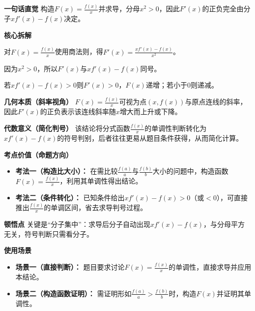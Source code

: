 \begin{explanationbox}
	\textbf{\textcolor{CExplanation}{一句话直觉}}
	构造$F(x)=\frac{f(x)}{x}$并求导，分母$x^{2}>0$，因此$F'(x)$的正负完全由分子$x f'(x)-f(x)$决定。

	\medskip
	\textbf{\textcolor{CExplanation}{核心拆解}}
	\begin{description}[style=nextline, leftmargin=2.8em, labelsep=0.5em, itemsep=0.45em]
		\item[\textbf{要点一（求导结果）：}]
			对$F(x)=\frac{f(x)}{x}$使用商法则，得$F'(x)=\frac{x f'(x)-f(x)}{x^{2}}$。
		\item[\textbf{要点二（符号判定）：}]
			因为$x^{2}>0$，所以$F'(x)$与$x f'(x)-f(x)$同号。
		\item[\textbf{要点三（单调对应）：}]
			若$x f'(x)-f(x)>0$则$F'(x)>0$，$F(x)$递增；若小于$0$则递减。
	\end{description}

	\medskip
	\textbf{\textcolor{CExplanation}{几何本质（斜率视角）}}
	$F(x)=\frac{f(x)}{x}$可视为点$(x,f(x))$与原点连线的斜率，因此$F'(x)$的正负表示该连线斜率随$x$增大而上升或下降。

	\medskip
	\textbf{\textcolor{CExplanation}{代数意义（简化判号）}}
	该结论将分式函数$\frac{f(x)}{x}$的单调性判断转化为$x f'(x)-f(x)$的符号判别，后者往往更易从题目条件获得，从而简化计算。

	\medskip
	\textbf{\textcolor{CExplanation}{考点价值（命题方向）}}
	\begin{itemize}[leftmargin=*, itemsep=0.5em, topsep=0.4em]
		\item \textbf{考法一（构造比大小）：} 在需比较$\frac{f(a)}{a}$与$\frac{f(b)}{b}$大小的问题中，构造函数$F(x)=\frac{f(x)}{x}$，利用其单调性得出结论。
		\item \textbf{考法二（条件转化）：} 已知条件给出$x f'(x)-f(x)>0$（或$<0$），可直接推出$\frac{f(x)}{x}$的单调区间，省去求导判号过程。
	\end{itemize}

	\medskip
	\textbf{\textcolor{CExplanation}{顿悟点}}
	关键是“分子集中”：求导后分子自动出现$x f'(x)-f(x)$，与分母平方无关，符号判断只需看分子。

	\medskip
	\textbf{\textcolor{CExplanation}{使用场景}}
	\begin{itemize}[leftmargin=*, itemsep=0.5em, topsep=0.4em]
		\item \textbf{场景一（直接判断）：} 题目要求讨论$F(x)=\frac{f(x)}{x}$的单调性，直接求导并应用本结论。
		\item \textbf{场景二（构造函数证明）：} 需证明形如$\frac{f(a)}{a}>\frac{f(b)}{b}$时，构造$F(x)$并证明其单调性。
	\end{itemize}

\end{explanationbox}

